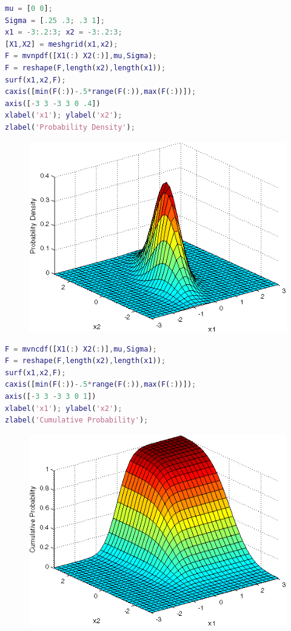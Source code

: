 \documentclass{article}
\begin{document}
\begin{lstlisting}[language=Matlab]
mu = [0 0];
Sigma = [.25 .3; .3 1];
x1 = -3:.2:3; x2 = -3:.2:3;
[X1,X2] = meshgrid(x1,x2);
F = mvnpdf([X1(:) X2(:)],mu,Sigma);
F = reshape(F,length(x2),length(x1));
surf(x1,x2,F);
caxis([min(F(:))-.5*range(F(:)),max(F(:))]);
axis([-3 3 -3 3 0 .4])
xlabel('x1'); ylabel('x2');
zlabel('Probability Density');
\end{lstlisting}

\begin{figure}[htbp]
  \centering
  \includegraphics[scale=0.75]{multivariate_normal1}
\end{figure}

\begin{lstlisting}[language=Matlab]
F = mvncdf([X1(:) X2(:)],mu,Sigma);
F = reshape(F,length(x2),length(x1));
surf(x1,x2,F);
caxis([min(F(:))-.5*range(F(:)),max(F(:))]);
axis([-3 3 -3 3 0 1])
xlabel('x1'); ylabel('x2');
zlabel('Cumulative Probability');
\end{lstlisting}

\begin{figure}[htbp]
  \centering
  \includegraphics[scale=0.75]{multivariate_normal2}
\end{figure}
\end{document}
